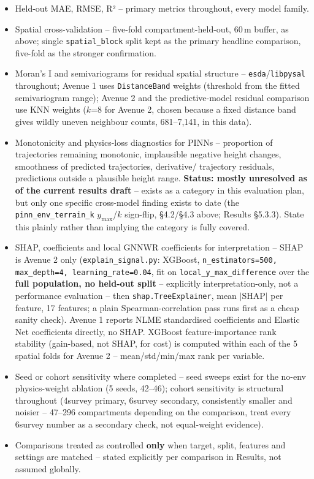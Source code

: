 \documentclass[11pt,a4paper]{report}
\begin{document}
\begin{itemize}
\setlength\itemsep{0pt}
\item Held-out MAE, RMSE, R² -- primary metrics throughout, every model family.
\item Spatial cross-validation -- five-fold compartment-held-out, 60\,m buffer, as above; single
\texttt{spatial\_block} split kept as the primary headline comparison, five-fold as the stronger
confirmation.
\item Moran's I and semivariograms for residual spatial structure -- \texttt{esda}/\texttt{libpysal}
throughout; Avenue 1 uses \texttt{DistanceBand} weights (threshold from the fitted semivariogram
range); Avenue 2 and the predictive-model residual comparison use KNN weights ($k$=8 for Avenue 2,
chosen because a fixed distance band gives wildly uneven neighbour counts, 681--7,141, in this
data).
\item Monotonicity and physics-loss diagnostics for PINNs -- proportion of trajectories remaining
monotonic, implausible negative height changes, smoothness of predicted trajectories, derivative/
trajectory residuals, predictions outside a plausible height range. \textbf{Status: mostly
unresolved as of the current results draft} -- exists as a category in this evaluation plan, but
only one specific cross-model finding exists to date (the \texttt{pinn\_env\_terrain\_k}
$y_{\max}$/$k$ sign-flip, \S4.2/\S4.3 above; Results \S5.3.3). State this plainly rather than
implying the category is fully covered.
\item SHAP, coefficients and local GNNWR coefficients for interpretation -- SHAP is Avenue 2 only
(\texttt{explain\_signal.py}: XGBoost, \texttt{n\_estimators=500, max\_depth=4, learning\_rate=0.04},
fit on \texttt{local\_y\_max\_difference} over the \textbf{full population, no held-out split} --
explicitly interpretation-only, not a performance evaluation -- then \texttt{shap.TreeExplainer},
mean $|\text{SHAP}|$ per feature, 17 features; a plain Spearman-correlation pass runs first as a
cheap sanity check). Avenue 1 reports NLME standardised coefficients and Elastic Net coefficients
directly, no SHAP. XGBoost feature-importance rank stability (gain-based, not SHAP, for cost) is
computed within each of the 5 spatial folds for Avenue 2 -- mean/std/min/max rank per variable.
\item Seed or cohort sensitivity where completed -- seed sweeps exist for the no-env physics-weight
ablation (5 seeds, 42--46); cohort sensitivity is structural throughout (4survey primary, 6survey
secondary, consistently smaller and noisier -- 47--296 compartments depending on the comparison,
treat every 6survey number as a secondary check, not equal-weight evidence).
\item Comparisons treated as controlled \textbf{only} when target, split, features and settings are
matched -- stated explicitly per comparison in Results, not assumed globally.
\end{itemize}
\end{document}
